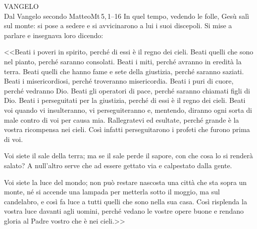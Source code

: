 \documentclass[11pt]{book}
\begin{document}
\begin{vangelo}{VANGELO\\\cross Dal Vangelo secondo Matteo}{Mt\,5,\,1--16}
In quel tempo, vedendo le folle, Gesù salì sul monte: si pose 
a sedere e si avvicinarono a lui i suoi discepoli. 
Si mise a parlare e insegnava loro dicendo:

<<Beati i poveri in spirito, perché di essi è il regno dei cieli.
Beati quelli che sono nel pianto, perché saranno consolati.
Beati i miti, perché avranno in eredità la terra.
Beati quelli che hanno fame e sete della giustizia, perché saranno saziati.
Beati i misericordiosi, perché troveranno misericordia.
Beati i puri di cuore, perché vedranno Dio.
Beati gli operatori di pace, perché saranno chiamati figli di Dio.
Beati i perseguitati per la giustizia, perché di essi è il regno dei cieli.
Beati voi quando vi insulteranno, vi perseguiteranno e, mentendo, diranno ogni sorta di male contro di voi per causa mia. Rallegratevi ed esultate, perché grande è la vostra ricompensa nei cieli. Così infatti perseguitarono i profeti che furono prima di voi.

Voi siete il sale della terra; ma se il sale perde il sapore, con che cosa lo si renderà
salato? A null'altro serve che ad essere gettato via e calpestato dalla gente.

Voi siete la luce del mondo; non può restare nascosta una città che sta sopra un monte,
né si accende una lampada per metterla sotto il moggio, ma sul candelabro, e così fa
luce a tutti quelli che sono nella sua casa. Così risplenda la vostra luce davanti
agli uomini, perché vedano le vostre opere buone e rendano gloria al Padre vostro che
è nei cieli.>>
\end{vangelo}

\newpage


\matrintro
\medskip

\matrpre
\medskip

\newpage

\consintro[2]

\vspace{15pt}

\promesse[2]
\medskip

\accoglienzaDelConsenso

\newpage

\vfill

\end{document}
